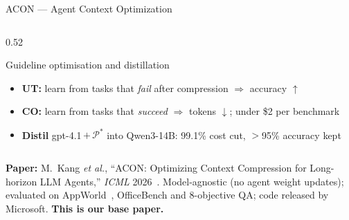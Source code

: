 \documentclass[aspectratio=169,10pt]{beamer}
\begin{document}
\begin{frame}{ACON --- Agent Context Optimization}
\begin{columns}[T]
\begin{column}{0.52\textwidth}
\begin{block}{Guideline optimisation and distillation}
\scriptsize
\begin{itemize}
  \item \textbf{UT:} learn from tasks that \emph{fail} after compression
        $\Rightarrow$ accuracy $\uparrow$
  \item \textbf{CO:} learn from tasks that \emph{succeed} $\Rightarrow$
        tokens $\downarrow$; under \$2 per benchmark
  \item \textbf{Distil} gpt-4.1\,$+\,\mathcal{P}^*$ into Qwen3-14B:
        99.1\% cost cut, $>$95\% accuracy kept
\end{itemize}
\end{block}
\end{column}
\end{columns}

\vspace{0.12cm}
{\scriptsize
\textbf{Paper:} M.~Kang \emph{et al.}, ``ACON: Optimizing Context Compression
for Long-horizon LLM Agents,'' \emph{ICML} 2026~\cite{ACON}. Model-agnostic
(no agent weight updates); evaluated on AppWorld~\cite{AppWorld}, OfficeBench
and 8-objective QA; code released by Microsoft. \textbf{This is our base
paper.}}
\end{frame}
\end{document}
